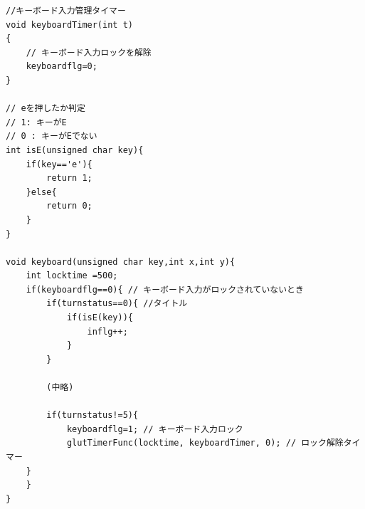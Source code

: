 \documentclass[a4j]{jarticle}
\begin{document}
        \begin{lstlisting}[basicstyle=\ttfamily\footnotesize, frame=single,label=startgamekey,caption=キーボードの入力制御(ゲームスタート)]
//キーボード入力管理タイマー 
void keyboardTimer(int t)
{
    // キーボード入力ロックを解除
    keyboardflg=0;
}

// eを押したか判定
// 1: キーがE
// 0 : キーがEでない
int isE(unsigned char key){
    if(key=='e'){
        return 1;
    }else{
        return 0;
    }
}

void keyboard(unsigned char key,int x,int y){
    int locktime =500;
    if(keyboardflg==0){ // キーボード入力がロックされていないとき
        if(turnstatus==0){ //タイトル
            if(isE(key)){
                inflg++;
            }
        }

        (中略)
        
        if(turnstatus!=5){
            keyboardflg=1; // キーボード入力ロック
            glutTimerFunc(locktime, keyboardTimer, 0); // ロック解除タイマー
    }
    }
}

    \end{lstlisting} 
\end{document}
